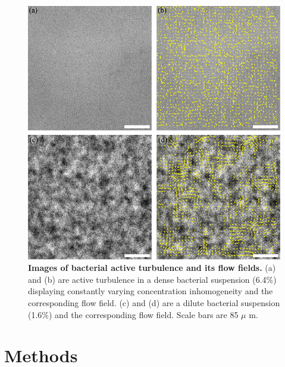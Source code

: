 \begin{figure}[!h]
\begin{center}
\includegraphics[width=5.5in]{figs/5-GNF/1.pdf}
\caption[Images of bacterial active turbulence and its flow fields]
{
\textbf{Images of bacterial active turbulence and its flow fields.}
(a) and (b) are active turbulence in a dense bacterial suspension (6.4\%) displaying constantly varying concentration inhomogeneity and the corresponding flow field.
(c) and (d) are a dilute bacterial suspension (1.6\%) and the corresponding flow field.
Scale bars are 85 $\mu$ m.
}
\label{fig:experiment}
\end{center}
\end{figure}


\section{Methods}

